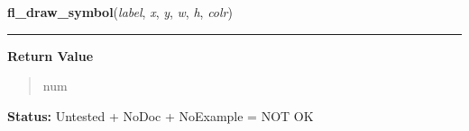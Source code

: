 \hspace{.8\funcindent}\begin{boxedminipage}{\funcwidth}

    \raggedright \textbf{fl\_draw\_symbol}(\textit{label}, \textit{x}, \textit{y}, \textit{w}, \textit{h}, \textit{colr})

    \vspace{-1.5ex}

    \rule{\textwidth}{0.5\fboxrule}
\setlength{\parskip}{2ex}
\setlength{\parskip}{1ex}
      \textbf{Return Value}
    \vspace{-1ex}

      \begin{quote}
      num

      \end{quote}

\textbf{Status:} Untested + NoDoc + NoExample = NOT OK



    \end{boxedminipage}

    \label{xformslib:library:fl_mapcolor}

    \vspace{0.5ex}

